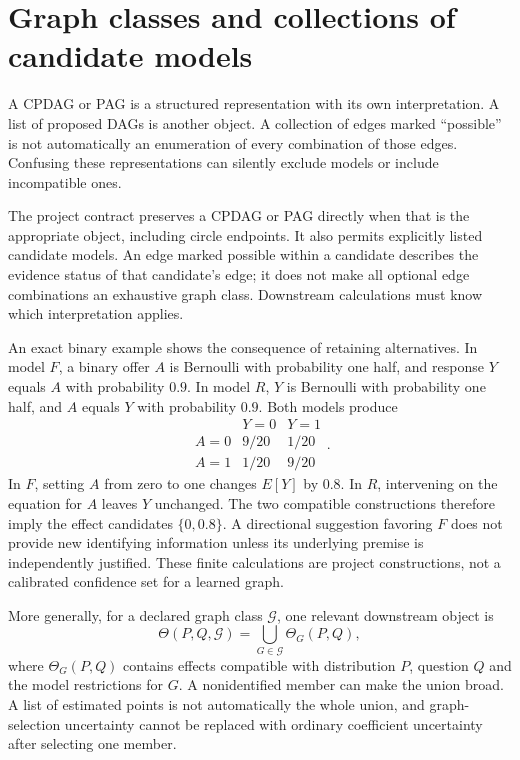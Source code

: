 \section{Graph classes and collections of candidate models}

A CPDAG or PAG is a structured representation with its own interpretation.
A list of proposed DAGs is another object. A collection of edges marked
``possible'' is not automatically an enumeration of every combination of
those edges. Confusing these representations can silently exclude models
or include incompatible ones.

The project contract preserves a CPDAG or PAG directly when that is the
appropriate object, including circle endpoints. It also permits explicitly
listed candidate models. An edge marked possible within a candidate describes
the evidence status of that candidate's edge; it does not make all optional
edge combinations an exhaustive graph class. Downstream calculations must
know which interpretation applies.

An exact binary example shows the consequence of retaining alternatives.
In model \(F\), a binary offer \(A\) is Bernoulli with probability one half,
and response \(Y\) equals \(A\) with probability \(0.9\). In model \(R\),
\(Y\) is Bernoulli with probability one half, and \(A\) equals \(Y\) with
probability \(0.9\). Both models produce
\[
\begin{array}{c|cc}
 &Y=0&Y=1\\\hline
A=0&9/20&1/20\\
A=1&1/20&9/20
\end{array}.
\]
In \(F\), setting \(A\) from zero to one changes \(E[Y]\) by \(0.8\).
In \(R\), intervening on the equation for \(A\) leaves \(Y\) unchanged.
The two compatible constructions therefore imply the effect candidates
\(\{0,0.8\}\). A directional suggestion favoring \(F\) does not provide
new identifying information unless its underlying premise is independently
justified. These finite calculations are project constructions, not a
calibrated confidence set for a learned graph.

More generally, for a declared graph class \(\mathcal G\), one relevant
downstream object is
\begin{equation}
 \Theta(P,Q,\mathcal G)=\bigcup_{G\in\mathcal G}\Theta_G(P,Q),
 \label{la:graph-union}
\end{equation}
where \(\Theta_G(P,Q)\) contains effects compatible with distribution \(P\),
question \(Q\) and the model restrictions for \(G\). A nonidentified member
can make the union broad. A list of estimated points is not automatically
the whole union, and graph-selection uncertainty cannot be replaced with
ordinary coefficient uncertainty after selecting one member.

